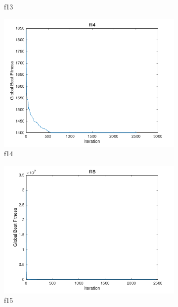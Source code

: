 \begin{figure}
\begin{subfigure}[b]{0.4\textwidth}
    \caption{f13}
  \end{subfigure}
  \begin{subfigure}[b]{0.4\textwidth}
    \includegraphics[width=\textwidth]{img/cecrt/f14}
    \caption{f14}
  \end{subfigure}
  \begin{subfigure}[b]{0.4\textwidth}
    \includegraphics[width=\textwidth]{img/cecrt/f15}
    \caption{f15}
  \end{subfigure}
  \begin{subfigure}[b]{0.4\textwidth}

\end{subfigure}
\end{figure}
